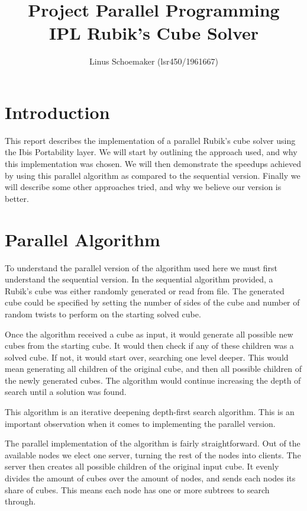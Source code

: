 \documentclass[a4paper,11pt]{article}
\title{Project Parallel Programming \\ IPL Rubik's Cube Solver}
\author{ Linus Schoemaker (lsr450/1961667)}
\begin{document}
\maketitle

\section{Introduction}

This report describes the implementation of a parallel Rubik's cube solver using the Ibis Portability layer. We will start by outlining the approach used, and why this implementation was chosen. We will then demonstrate the speedups achieved by using this parallel algorithm as compared to the sequential version. Finally we will describe some other approaches tried, and why we believe our version is better.

\section{Parallel Algorithm}

To understand the parallel version of the algorithm used here we must first understand the sequential version.
In the sequential algorithm provided, a Rubik's cube was either randomly generated or read from file. The generated cube could be specified by setting the number of sides of the cube and number of random twists to perform on the starting solved cube. 

Once the algorithm received a cube as input, it would generate all possible new cubes from the starting cube. It would then check if any of these children was a solved cube. If not, it would start over, searching one level deeper. This would mean generating all children of the original cube, and then all possible children of the newly generated cubes. The algorithm would continue increasing the depth of search until a solution was found.

This algorithm is an iterative deepening depth-first search algorithm. This is an important observation when it comes to implementing the parallel version. 


The parallel implementation of the algorithm is fairly straightforward. Out of the available nodes we elect one server, turning the rest of the nodes into clients. The server then creates all possible children of the original input cube. It evenly divides the amount of cubes over the amount of nodes, and sends each nodes its share of cubes. This means each node has one or more subtrees to search through. 
\end{document}
